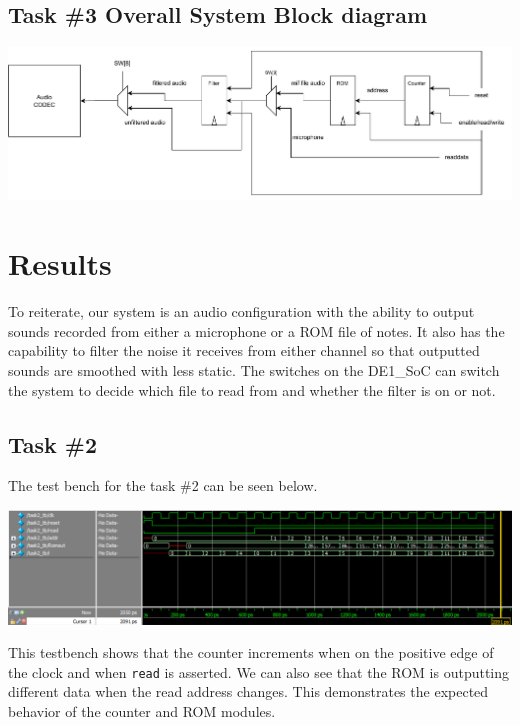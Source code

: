 \documentclass[11pt, titlepage]{article}
\begin{document}
        \subsection{Task \#3 Overall System Block diagram}
            \begin{center}
                \includegraphics[scale=0.6]{Images/task 3 block diagram.pdf}
            \end{center}
        
    

    \section{Results}
    To reiterate, our system is an audio configuration with the ability to output sounds recorded from either a microphone or a ROM file of notes. It also has the capability to filter the noise it receives from either channel so that outputted sounds are smoothed with less static. The switches on the DE1\_SoC can switch the system to decide which file to read from and whether the filter is on or not.

        \subsection{Task \#2}
            The test bench for the task \#2 can be seen below. \\
            \begin{center}
                \includegraphics[scale = 0.5]{Images/task 2 testbench.png}
            \end{center}
            This testbench shows that the counter increments when on the positive edge of the clock and when \texttt{read} is asserted. We can also see that the ROM is outputting different data when the read address changes. This demonstrates the expected behavior of the counter and ROM modules.
        
\end{document}
